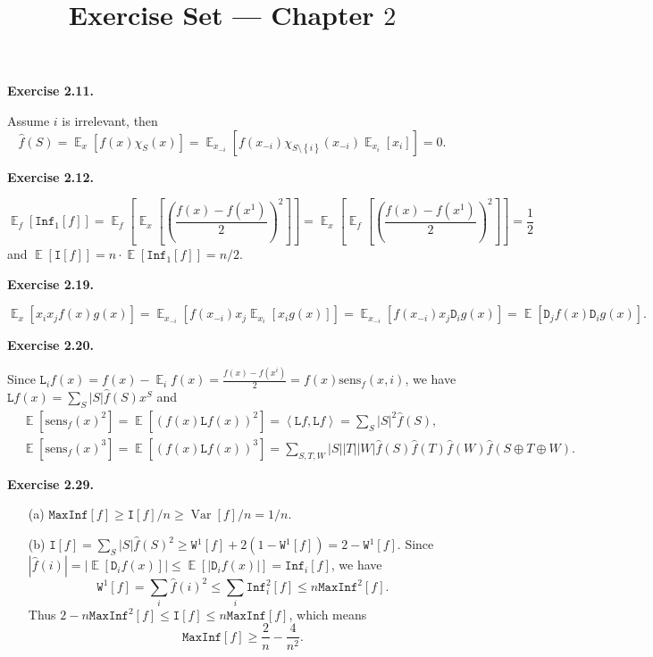 \documentclass[a4paper]{article}
\title{Exercise Set --- Chapter $2$}
\date{}
\newenvironment{exercise}[1]{
	\par
	\noindent\textbf{Exercise #1.}\quad
}{
	\par
	\bigskip
}
\DeclareMathOperator{\E}{\mathbb E}
\DeclareMathOperator{\Var}{\mathrm{Var}}
\newcommand{\abs}[1]{{\left| #1 \right|}}
\newcommand{\abra}[1]{{\left\langle #1 \right\rangle}}
\newcommand{\pbra}[1]{{\left( #1 \right)}}
\newcommand{\cbra}[1]{{\left\{ #1 \right\}}}
\newcommand{\sbra}[1]{{\left[ #1 \right]}}
\newcommand{\Inf}{\mathtt{Inf}}
\newcommand{\MaxInf}{\mathtt{MaxInf}}
\newcommand{\Dtt}{\mathtt{D}}
\newcommand{\Itt}{\mathtt{I}}
\newcommand{\Ltt}{\mathtt{L}}
\newcommand{\Wtt}{\mathtt{W}}
\begin{document}
\maketitle

\begin{exercise}{2.11}
    Assume $i$ is irrelevant, then
    $$
    \hat f(S)=\E_{x}\sbra{f(x)\chi_S(x)}=\E_{x_{-i}}\sbra{f(x_{-i})\chi_{S\setminus\cbra{i}}(x_{-i})\E_{x_i}\sbra{x_i}}=0.
    $$
\end{exercise}

\begin{exercise}{2.12}
    $$
    \E_f\sbra{\Inf_1\sbra{f}}
    =\E_f\sbra{\E_x\sbra{\pbra{\frac{f(x)-f(x^1)}2}^2}}
    =\E_x\sbra{\E_f\sbra{\pbra{\frac{f(x)-f(x^1)}2}^2}}
    =\frac12
    $$
    and $\E\sbra{\Itt\sbra{f}}=n\cdot\E\sbra{\Inf_1\sbra{f}}=n/2$.
\end{exercise}

\begin{exercise}{2.19}
    $$
    \E_x\sbra{x_ix_jf(x)g(x)}
    =\E_{x_{-i}}\sbra{f(x_{-i})x_j\E_{x_i}\sbra{x_ig(x)}}
    =\E_{x_{-i}}\sbra{f(x_{-i})x_j\Dtt_ig(x)}
    =\E\sbra{\Dtt_jf(x)\Dtt_ig(x)}.
    $$
\end{exercise}

\begin{exercise}{2.20}
    Since $\Ltt_if(x)=f(x)-\E_if(x)=\frac{f(x)-f(x^i)}2=f(x)\text{sens}_f(x,i)$, 
    we have $\Ltt f(x)=\sum_S|S|\hat f(S)x^S$ and
    \begin{align*}
        &\E\sbra{\text{sens}_f(x)^2}=\E\sbra{(f(x)\Ltt f(x))^2}=\abra{\Ltt f,\Ltt f}=\sum_S|S|^2\hat f(S),\\
        &\E\sbra{\text{sens}_f(x)^3}=\E\sbra{(f(x)\Ltt f(x))^3}=\sum_{S,T,W}|S||T||W|\hat f(S)\hat f(T)\hat f(W)\hat f(S\oplus T\oplus W).
    \end{align*}
\end{exercise}

\begin{exercise}{2.29}
    \begin{itemize}
        \item[(a)] $\MaxInf\sbra{f}\geq\Itt\sbra{f}/n\geq\Var\sbra{f}/n=1/n$.
        \item[(b)] $\Itt\sbra{f}=\sum_S|S|\hat f(S)^2\geq\Wtt^1\sbra{f}+2(1-\Wtt^1\sbra{f})=2-\Wtt^1[f]$.
            Since $\abs{\hat f(i)}=\abs{\E\sbra{\Dtt_if(x)}}\leq\E\sbra{\abs{\Dtt_if(x)}}=\Inf_i[f]$, we have
            $$
            \Wtt^1[f]=\sum_i\hat f(i)^2\leq\sum_i\Inf_i^2[f]\leq n\MaxInf^2[f].
            $$
            Thus $2-n\MaxInf^2[f]\leq\Itt[f]\leq n\MaxInf[f]$, which means
            $$
            \MaxInf[f]\geq\frac2n-\frac4{n^2}.
            $$
    \end{itemize}
\end{exercise}
\end{document}
